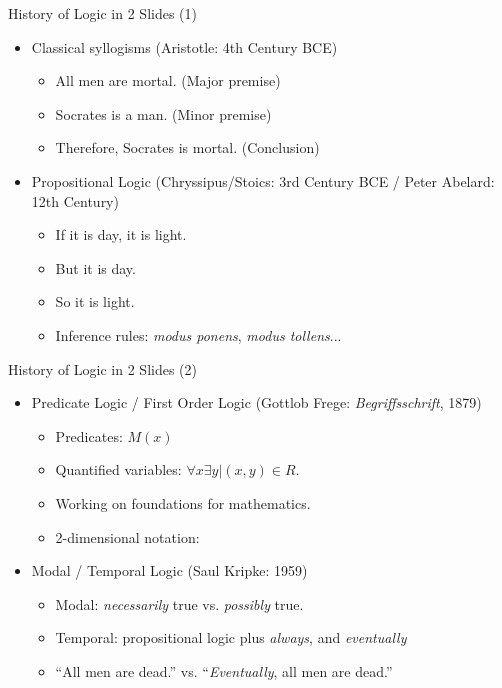 \documentclass[style=sailor,size=12pt]{powerdot}
\begin{document}
\begin{wideslide}[bm=,toc=]{History of Logic in 2 Slides (1)} 
\begin{itemize}
\item Classical syllogisms (Aristotle: 4th Century BCE)
\begin{itemize}
\item<2-> All men are mortal. (Major premise)
\item<2-> Socrates is a man. (Minor premise)
\item<2-> Therefore, Socrates is mortal. (Conclusion)
\end{itemize}
\item Propositional Logic (Chryssipus/Stoics: 3rd Century BCE / Peter Abelard: 12th Century)
\begin{itemize}
\item<3-> If it is day, it is light. 
\item<3-> But it is day.
\item<3-> So it is light. 
\item<4-> Inference rules: \emph{modus ponens}, \emph{modus tollens}...
\end{itemize}


\end{itemize}



\end{wideslide}
\begin{wideslide}[bm=,toc=]{History of Logic in 2 Slides (2)}

\begin{itemize} 
\item Predicate Logic / First Order Logic (Gottlob Frege: \emph{Begriffsschrift}, 1879) 
\begin{itemize}
\item<2-> Predicates: $M(x)$ 
\item<2-> Quantified variables: $\forall x \exists y | (x,y) \in R$.
\item<2-> Working on foundations for mathematics.
\item<3-> 2-dimensional notation:
\end{itemize}
\item Modal / Temporal Logic (Saul Kripke: 1959)
\begin{itemize}
\item<4-> Modal: \emph{necessarily} true vs. \emph{possibly} true. 
\item<4-> Temporal: propositional logic plus \emph{always}, and \emph{eventually}
\item<5-> ``All men are dead.'' vs. ``\emph{Eventually}, all men are  dead.''
\end{itemize}
\end{itemize}
\end{wideslide}
\end{document}
